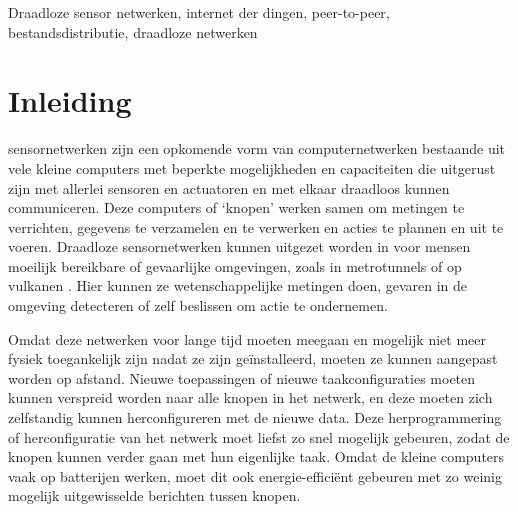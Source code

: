 \documentclass[journal]{IEEEtran}
\begin{document}
\begin{IEEEkeywords}
Draadloze sensor netwerken, internet der dingen, peer-to-peer, bestandsdistributie, draadloze netwerken
\end{IEEEkeywords}






%
\IEEEpeerreviewmaketitle



\section{Inleiding}
% 
% 
% 
% 
 sensornetwerken zijn een opkomende vorm van computernetwerken bestaande uit vele kleine computers met beperkte mogelijkheden en capaciteiten die uitgerust zijn met allerlei sensoren en actuatoren en met elkaar draadloos kunnen communiceren. Deze computers of `knopen' werken samen om metingen te verrichten, gegevens te verzamelen en te verwerken en acties te plannen en uit te voeren. Draadloze sensornetwerken kunnen uitgezet worden in voor mensen moeilijk bereikbare of gevaarlijke omgevingen, zoals in metrotunnels of op vulkanen \cite{reventador}. Hier kunnen ze wetenschappelijke metingen doen, gevaren in de omgeving detecteren of zelf beslissen om actie te ondernemen.

Omdat deze netwerken voor lange tijd moeten meegaan en mogelijk niet meer fysiek toegankelijk zijn nadat ze zijn ge\"installeerd, moeten ze kunnen aangepast worden op afstand. Nieuwe toepassingen of nieuwe taakconfiguraties moeten kunnen verspreid worden naar alle knopen in het netwerk, en deze moeten zich zelfstandig kunnen herconfigureren met de nieuwe data. Deze herprogrammering of herconfiguratie van het netwerk moet liefst zo snel mogelijk gebeuren, zodat de knopen kunnen verder gaan met hun eigenlijke taak. Omdat de kleine computers vaak op batterijen werken, moet dit ook energie-effici\"ent gebeuren met zo weinig mogelijk uitgewisselde berichten tussen knopen.
\end{document}
